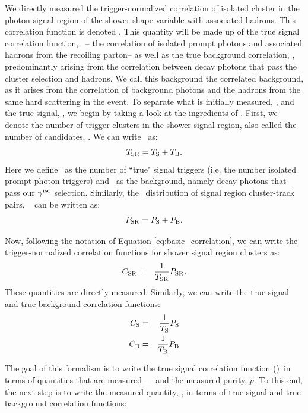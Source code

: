 We directly measured the trigger-normalized correlation of isolated cluster in the photon signal region of the shower shape variable with associated hadrons. This correlation function is denoted \CSR. This quantity will be made up of the true signal correlation function, \CS~-- the correlation of isolated prompt photons and associated hadrons from the recoiling parton-- as well as the true background correlation, \CB, predominantly arising from the correlation between decay photons that pass the cluster selection and hadrons. We call this background the correlated background, as it arises from the correlation of background photons and the hadrons from the same hard scattering in the event. To separate what is initially measured, \CSR, and the true signal, \CS, we begin by taking a look at the ingredients of \CSR. First, we denote the number of trigger clusters in the shower signal region, also called the number of \gammaiso candidates, \TSR. We can write \TSR~as:
\begin{equation}
  \label{eq:TS_TB}
  T_{\mathrm{SR}} = T_{\mathrm{S}} + T_{\mathrm{B}}.
\end{equation}
Here we define \TS~as the number of ``true" signal triggers (i.e. the number isolated prompt photon triggers) and \TB~as the background, namely decay photons that pass our $\gamma^\mathrm{iso}$ selection. Similarly, the \deltaphi~distribution of signal region cluster-track pairs, \PSR~ can be written as:
\begin{equation}
  \label{eq:PS_PB}
  P_{\mathrm{SR}} = P_{\mathrm{S}} + P_{\mathrm{B}}.
\end{equation}

Now, following the notation of Equation \ref{eq:basic_correlation}, we can write the  trigger-normalized correlation functions for shower signal region clusters as:
\begin{eqnarray}
  \label{eq:CSR}
  C_{\mathrm{SR}} &=& \frac{1}{T_{\mathrm{SR}}}P_{\mathrm{SR}}.
\end{eqnarray}
These quantities are directly measured. Similarly, we can write the true signal and true background correlation functions:
\begin{eqnarray}
  C_{\mathrm{S}} &=& \frac{1}{T_{\mathrm{S}}}P_{\mathrm{S}}\\\label{eq:CS}
  C_{\mathrm{B}} &=& \frac{1}{T_{\mathrm{B}}}P_{\mathrm{B}}\label{eq:CB}
\end{eqnarray}

The goal of this formalism is to write the true signal correlation function (\CS)~in terms of quantities that are measured --  \CSR~and the measured purity, $p$. To this end, the next step is to write the measured quantity, \CSR, in terms of true signal and true background correlation functions:


